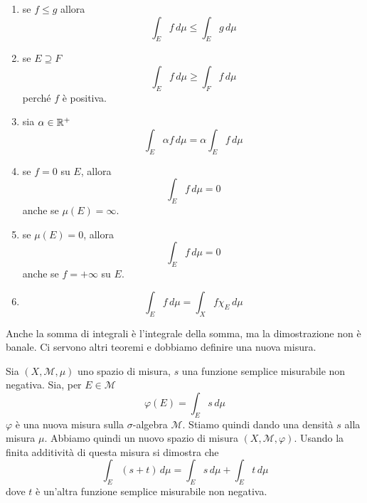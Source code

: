 \documentclass[a4paper]{article}
\begin{document}
\begin{radioactive}
\begin{snippetproposition}{}
    \begin{enumerate}
        \item se \(f \leq g\) allora
            \[
                \int_E f\,d\mu \leq \int_E g\,d\mu
            \]
        \item se \(E \supseteq F\)
            \[
                \int_E f\,d\mu \geq \int_F f\,d\mu
            \]
            perché \(f\) è positiva.
        \item sia \(\alpha \in \mathbb{R}^+\)
            \[
                \int_E \alpha f\,d\mu
                = \alpha \int_E f\,d\mu
            \]
        \item se \(f=0\) su \(E\), allora
            \[
                \int_E f\,d\mu = 0
            \]
            anche se \(\mu(E) = \infty\).
        \item se \(\mu(E)=0\), allora
            \[
                \int_E f\,d\mu = 0
            \]
            anche se \(f=+\infty\) su \(E\).
        \item \[
                \int_E f\,d\mu
                = \int_X f \chi_E \,d\mu
            \]
    \end{enumerate}
\end{snippetproposition}
\end{radioactive}

\begin{radioactive}
Anche la somma di integrali è l'integrale della somma, ma la dimostrazione non è banale.
Ci servono altri teoremi e dobbiamo definire una nuova misura.
\end{radioactive}

\begin{radioactive}
\begin{snippetproposition}{}
    Sia \((X, \mathcal M, \mu)\)
    uno spazio di misura,
    \(s\) una funzione semplice misurabile non negativa.
    Sia, per \(E \in \mathcal M\)
    \[
        \varphi(E) = \int_E s\,d\mu
    \]
    \(\varphi\) è una nuova misura sulla \(\sigma\)-algebra \(\mathcal M\).
    Stiamo quindi dando una densità \(s\) alla misura \(\mu\).
    Abbiamo quindi un nuovo spazio di misura \((X, \mathcal M, \varphi)\).
    Usando la finita additività di questa misura si dimostra che
    \[
        \int_E (s+t)\,d\mu = \int_E s\,d\mu
        + \int_E t\,d\mu
    \]
    dove \(t\) è un'altra funzione semplice misurabile non negativa.
\end{snippetproposition}
\end{radioactive}
\end{document}
